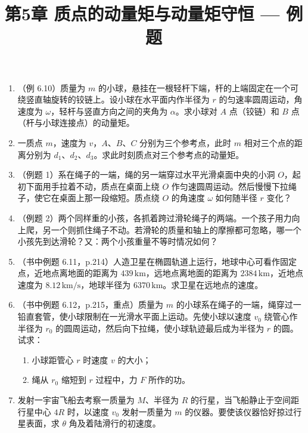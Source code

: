 \documentclass{ctexart}
\title{\textbf{第5章 质点的动量矩与动量矩守恒} --- 例题}
\author{}
\date{}
\begin{document}
\maketitle

\begin{enumerate}

\item（例 6.10）质量为 $m$ 的小球，悬挂在一根轻杆下端，杆的上端固定在一个可绕竖直轴旋转的铰链上。设小球在水平面内作半径为 $r$ 的匀速率圆周运动，角速度为 $\omega$，轻杆与竖直方向之间的夹角为 $\alpha$。求小球对 $A$ 点（铰链）和 $B$ 点（杆与小球连接点）的动量矩。

\item 一质点 $m$，速度为 $v$，$A$、$B$、$C$ 分别为三个参考点，此时 $m$ 相对三个点的距离分别为 $d_1$、$d_2$、$d_3$。求此时刻质点对三个参考点的动量矩。

\item（例题 1）系在绳子的一端，绳的另一端穿过水平光滑桌面中央的小洞 $O$，起初下面用手拉着不动，质点在桌面上绕 $O$ 作匀速圆周运动。然后慢慢下拉绳子，使它在桌面上那一段缩短。质点绕 $O$ 的角速度 $\omega$ 如何随半径 $r$ 变化？

\item（例题 2）两个同样重的小孩，各抓着跨过滑轮绳子的两端。一个孩子用力向上爬，另一个则抓住绳子不动。若滑轮的质量和轴上的摩擦都可忽略，哪一个小孩先到达滑轮？又：两个小孩重量不等时情况如何？

\item（书中例题 6.11，p.214）人造卫星在椭圆轨道上运行，地球中心可看作固定点，近地点离地面的距离为 $439\,\text{km}$，远地点离地面的距离为 $2384\,\text{km}$，近地点速度为 $8.12\,\text{km/s}$，地球半径为 $6370\,\text{km}$。求卫星在远地点的速度。

\item（书中例题 6.12，p.215，重点）质量为 $m$ 的小球系在绳子的一端，绳穿过一铅直套管，使小球限制在一光滑水平面上运动。先使小球以速度 $v_0$ 绕管心作半径为 $r_0$ 的圆周运动，然后向下拉绳，使小球轨迹最后成为半径为 $r$ 的圆。试求：
\begin{enumerate}
  \item 小球距管心 $r$ 时速度 $v$ 的大小；
  \item 绳从 $r_0$ 缩短到 $r$ 过程中，力 $F$ 所作的功。
\end{enumerate}

\item 发射一宇宙飞船去考察一质量为 $M$、半径为 $R$ 的行星，当飞船静止于空间距行星中心 $4R$ 时，以速度 $v_0$ 发射一质量为 $m$ 的仪器。要使该仪器恰好掠过行星表面，求 $\theta$ 角及着陆滑行的初速度。

\end{enumerate}
\end{document}
